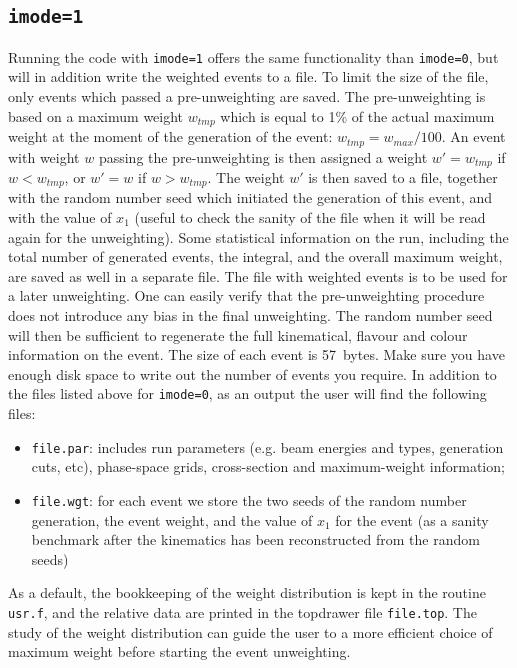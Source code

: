\documentclass[paper]{JHEP3}
\begin{document}
\begin{appendix}
\subsection{{\tt imode=1}}
Running the code with {\tt imode=1} offers the same functionality than
{\tt imode=0}, but will in addition write the weighted events to a
file. To limit the size of the file, only events which passed a
pre-unweighting are saved. The pre-unweighting is based on a maximum
weight $w_{tmp}$ which is equal to 1\% of the actual maximum weight at
the moment of the generation of the event: $w_{tmp}=w_{max}/100$.  An
event with weight $w$ passing the pre-unweighting is then assigned a
weight $w'=w_{tmp}$ if $w<w_{tmp}$, or $w'=w$ if $w>w_{tmp}$. The
weight $w'$ is then saved to a file, together with the random number
seed which initiated the generation of this event, and with the value
of $x_1$ (useful to check the sanity of the file when it will be read
again for the unweighting).  Some statistical information on the run,
including the total number of generated events, the integral, and the
overall maximum weight, are saved as well in a separate file. The file
with weighted events is to be used for a later unweighting. One can
easily verify that the pre-unweighting procedure does not introduce
any bias in the final unweighting. The random number seed will then be
sufficient to regenerate the full kinematical, flavour and colour
information on the event. The size of each event is 57~bytes. Make sure
you have enough disk space to write out the number of events you
require.  In addition to the files listed above for {\tt imode=0}, as
an output the user will find the following files:
\begin{itemize}
\item {\tt file.par}: includes run parameters (e.g. beam energies and types,
  generation cuts, etc), phase-space grids,  cross-section and maximum-weight
  information;
\item {\tt file.wgt}: for each event we store the two seeds of the
  random number generation, the event weight, and the value of $x_1$
  for the event (as a sanity benchmark after the kinematics has been
  reconstructed from the random seeds)
\end{itemize}
As a default, the bookkeeping of the weight distribution is kept in
the routine {\tt *usr.f}, and the relative data are printed in the
topdrawer file {\tt file.top}. The study of the weight distribution
can guide the user to a more efficient choice of maximum weight before
starting the event unweighting.

\end{appendix}
\end{document}
